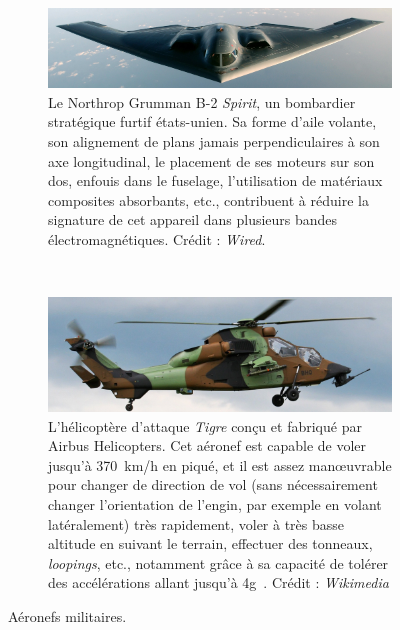 	\begin{figure}[htb]
		\begin{subfigure}[t]{\textwidth}
		\centering
		\includegraphics[width=\textwidth]{figures/ch1/B2}
		\caption[Northrop Grumman B-2 \emph{Spirit}, un bombardier stratégique furtif.]{Le Northrop Grumman B-2 \emph{Spirit}, un bombardier stratégique furtif états-unien. Sa forme d'aile volante, son alignement de plans jamais perpendiculaires à son axe longitudinal, le placement de ses moteurs sur son dos, enfouis dans le fuselage, l'utilisation de matériaux composites absorbants, etc., contribuent à réduire la signature de cet appareil dans plusieurs bandes électromagnétiques. Crédit : \emph{Wired}\footnotemark{}.}
		\label{fig:B2}
		\end{subfigure}
		~
		\begin{subfigure}[t]{\textwidth}
		\centering
		\includegraphics[width=\textwidth]{figures/ch1/tigre}
		\caption[Hélicoptère d'attaque \emph{Tigre}.]{L'hélicoptère d'attaque \emph{Tigre} conçu et fabriqué par Airbus Helicopters. Cet aéronef est capable de voler jusqu'à 370~km/h en piqué, et il est assez manœuvrable pour changer de direction de vol (sans nécessairement changer l'orientation de l'engin, par exemple en volant latéralement) très rapidement, voler à très basse altitude en suivant le terrain, effectuer des tonneaux, \emph{loopings}, etc., notamment grâce à sa capacité de tolérer des accélérations allant jusqu'à 4g~\cite{tigre}. Crédit : \emph{Wikimedia}}
		\label{fig:tigre}
		\end{subfigure}
		\caption{Aéronefs militaires.}
		\label{fig:coolAircraft}
	\end{figure}
	
	
	

